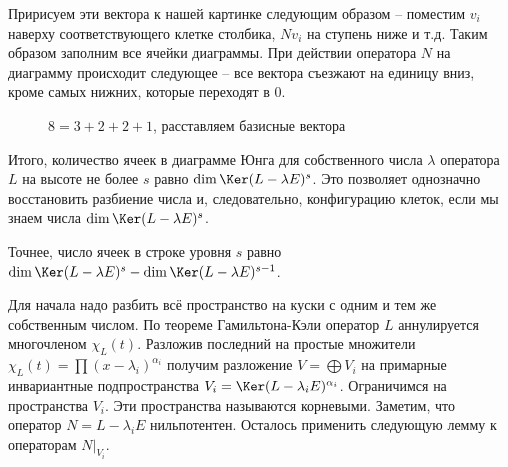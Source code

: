 Пририсуем эти вектора к нашей картинке следующим образом -- поместим $v_i$ наверху соответствующего клетке  столбика, $N v_i$ на ступень ниже и т.д. Таким образом заполним все ячейки диаграммы. При действии оператора $N$ на диаграмму происходит следующее -- все вектора съезжают на единицу вниз, кроме самых нижних, которые переходят в $0$.
\begin{figure}[hhh]
\begin{center}
\end{center}
\caption{$8=3+2+2+1$, расставляем базисные вектора}
\end{figure}
Итого, количество ячеек в диаграмме Юнга для собственного числа $\lambda$ оператора $L$ на высоте не более $s$ равно $\dim \Ker(L - \lambda E)^s $.
Это  позволяет однозначно восстановить разбиение числа и, следовательно, конфигурацию клеток, если мы знаем числа $\dim \Ker(L - \lambda E)^s $.

Точнее, число ячеек в строке уровня $s$ равно $\dim \Ker(L - \lambda E)^s -\dim \Ker(L - \lambda E)^{s-1} $.







\proof[Существование]


Для начала надо разбить всё пространство на куски с одним и тем же собственным числом. По теореме Гамильтона-Кэли оператор $L$ аннулируется многочленом $\chi_L(t)$. Разложив последний на простые множители $\chi_L(t)=\prod (x-\lambda_i)^{\alpha_i}$ получим разложение $V=\bigoplus V_i$ на примарные инвариантные подпространства $V_i=\Ker (L-\lambda_i E)^{\alpha_i}$. Ограничимся на пространства $V_i$. Эти пространства называются корневыми. Заметим, что оператор $N=L-\lambda_i E$ нильпотентен. Осталось применить следующую  лемму к операторам $N|_{V_i}$.

